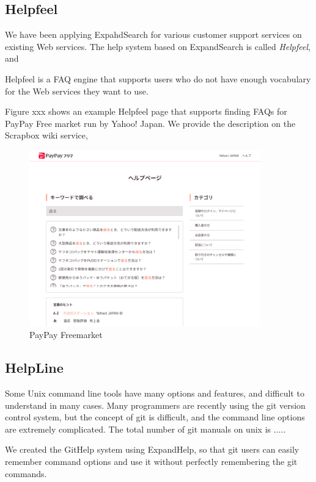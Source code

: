 \documentclass[manuscript,screen,review]{acmart}
\begin{document}
\subsection{Helpfeel}

We have been applying ExpahdSearch for various customer support services on existing Web services.
The help system based on ExpandSearch is called \textit{Helpfeel}, and

Helpfeel is a FAQ engine that supports users who do not have enough vocabulary for the Web services they want to use.


Figure xxx shows an example Helpfeel page that supports finding FAQs
for PayPay Free market run by Yahoo! Japan.
We provide the description on the Scrapbox wiki service,



\begin{figure}[H]
  \centering
  \includegraphics[width=10cm,bb=0 0 1716 1312]{figures/3d964512606a5e25646104a738ab104e.png}
  \caption{PayPay Freemarket}
\end{figure}

\subsection{HelpLine}

Some Unix command line tools have many options and features, and difficult to understand in many cases.
Many programmers are recently using the git version control system, but the concept of git is difficult, and
the command line options are extremely complicated.
The total number of git manuals on unix is .....

We created the GitHelp system using ExpandHelp, so that git users can easily
remember command options and use it without perfectly remembering the git commands.
\end{document}
